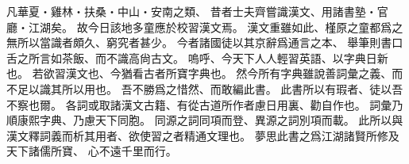 凡華夏・雞林・扶桑・中山・安南之類、
昔者士夫齊嘗識漢文、用諸書塾・官廳・江湖矣。
故今日該地多童應於校習漢文焉。
漢文重雖如此、槿原之童都爲之無所以當識者頗久、窮究者甚少。
今者諸國徒以其京辭爲通言之本、
舉筆則書口舌之所言如茶飯、而不識高尙古文。
嗚呼、今天下人人輕習英語、以字典日新也。
若欲習漢文也、今猶看古者所寶字典也。
然今所有字典雖說善詞彙之義、而不足以識其所以用也。
吾不勝爲之惜然、而敢編此書。
此書所以有瑕者、徒以吾不察也爾。
各詞或取諸漢文古籍、有從古道所作者慮日用裏、勸自作也。
詞彙乃順康熙字典、乃慮天下同胞。
同源之詞同項而登、異源之詞別項而載。
此所以與漢文釋詞義而析其用者、欲使習之者精通文理也。
夢思此書之爲江湖諸賢所修及天下諸儒所寶、
心不遠千里而行。

